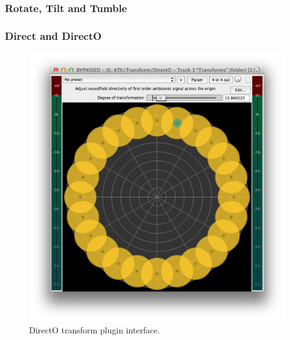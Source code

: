 \documentclass{article}
\begin{document}
\subsubsection{Rotate, Tilt and Tumble}\label{sec:rotate}

\subsubsection{Direct and DirectO}\label{sec:direct}

\begin{figure}[h]
\captionsetup{aboveskip=-6pt}
\centering
\includegraphics[width=0.9\columnwidth]{figures/directOTransform.png}
\caption{DirectO transform plugin interface.\label{fig:directOTransform}}
\end{figure}
\end{document}
